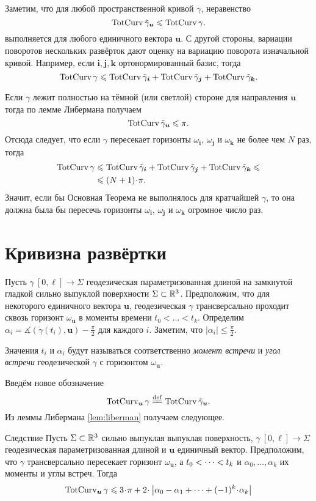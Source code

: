 \documentclass[a4paper,10pt]{article}
\begin{document}
Заметим, что для любой пространственной кривой $\gamma$, неравенство 
\[\mathop{\rm TotCurv}\nolimits\tilde\gamma_{\bm{u}}\leqslant\mathop{\rm TotCurv}\nolimits\gamma.\]
выполняется для любого единичного вектора $\bm{u}$. 
С другой стороны, вариации поворотов нескольких развёрток дают оценку на вариацию поворота изначальной кривой.
Например, если $\bm{i},\bm{j},\bm{k}$ ортонормированный базис, тогда
\[\mathop{\rm TotCurv}\nolimits\gamma
\leqslant
\mathop{\rm TotCurv}\nolimits\tilde\gamma_{\bm{i}}+\mathop{\rm TotCurv}\nolimits\tilde\gamma_{\bm{j}}+\mathop{\rm TotCurv}\nolimits\tilde\gamma_{\bm{k}}.\]

Если $\gamma$ лежит полностью на тёмной (или светлой) стороне для направления $\bm{u}$
тогда по лемме Либермана получаем 
\[\mathop{\rm TotCurv}\nolimits\tilde\gamma_{\bm{u}}\leqslant \pi.\]
Отсюда следует, что если $\gamma$ пересекает горизонты $\omega_{\bm{i}}$, $\omega_{\bm{j}}$ и $\omega_{\bm{k}}$
не более чем $N$ раз, тогда 
\begin{align*}
\tc\gamma
&\le
\tc\tilde\gamma_{\bm{i}}
+\tc\tilde\gamma_{\bm{j}}
+\tc\tilde\gamma_{\bm{k}}
\le
\\
&\le(N+1)\cdot \pi.
\end{align*}
Значит, если бы Основная Теорема не выполнялось для кратчайшей 
$\gamma$, то она должна была бы пересечь горизонты $\omega_{\bm{i}}$, $\omega_{\bm{j}}$ и $\omega_{\bm{k}}$ огромное число раз.

\section{Кривизна развёртки}\label{sec:curv-develop}

Пусть $\gamma\:[0,\ell]\to \Sigma$ геодезическая параметризованная длиной
на 
замкнутой гладкой сильно выпуклой поверхности $\Sigma\subset\mathbb{R}^3$.
Предположим, что для некоторого единичного вектора $\bm{u}$,
геодезическая $\gamma$ трансверсально проходит сквозь горизонт $\omega_{\bm{u}}$ в моменты времени 
$t_0<\dots <t_k$.
Определим $\alpha_i=\measuredangle(\dot\gamma(t_i),\bm{u})-\tfrac\pi2$ для каждого $i$.
Заметим, что $|\alpha_i|\le\tfrac\pi2$.

Значения $t_i$ и $\alpha_i$ 
будут называться соответственно \emph{момент встречи} 
и \emph{угол встречи}
геодезической $\gamma$ с горизонтом $\omega_{\bm{u}}$.

Введём новое обозначение
\[\tc_{\bm{u}}\gamma\df\tc\tilde\gamma_{\bm{u}}.\]
Из леммы Либермана \ref{lem:liberman} получаем следующее.

\begin{thm}{Следствие}\label{cor:liberman}
Пусть $\Sigma\subset\mathbb{R}^3$ сильно выпуклая выпуклая поверхность,
$\gamma\:[0,\ell]\to \Sigma$ геодезическая параметризованная длиной
и $\bm{u}$ единичный вектор.
Предположим, что  $\gamma$ трансверсально пересекает горизонт $\omega_{\bm{u}}$,
а $t_0\zz<\dots <t_k$ и $\alpha_0,\dots,\alpha_k$ их моменты и углы встреч.
Тогда
\[\tc_{\bm{u}}\gamma
\le 3\cdot\pi
+
2\cdot\left|\alpha_0-\alpha_1
+\dots +(-1)^k\cdot\alpha_k\right|
\]

\end{thm}
\end{document}
